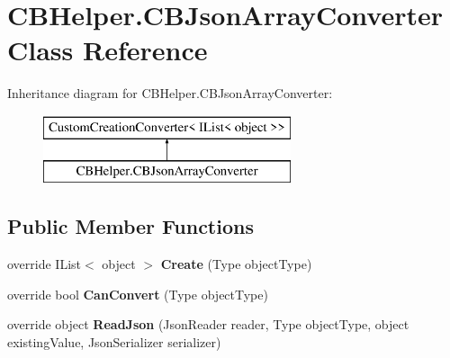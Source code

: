 \section{C\-B\-Helper.\-C\-B\-Json\-Array\-Converter Class Reference}
\label{class_c_b_helper_1_1_c_b_json_array_converter}
Inheritance diagram for C\-B\-Helper.\-C\-B\-Json\-Array\-Converter\-:\begin{figure}[H]
\begin{center}
\leavevmode
\includegraphics[height=2.000000cm]{class_c_b_helper_1_1_c_b_json_array_converter}
\end{center}
\end{figure}
\subsection*{Public Member Functions}
\begin{DoxyCompactItemize}
\item 
override I\-List$<$ object $>$ {\bfseries Create} (Type object\-Type)\label{class_c_b_helper_1_1_c_b_json_array_converter_a3d1211ac45f0526c728f25e09ebad0b7}

\item 
override bool {\bfseries Can\-Convert} (Type object\-Type)\label{class_c_b_helper_1_1_c_b_json_array_converter_a15dc069ce20ba205f0191047dcd52198}

\item 
override object {\bfseries Read\-Json} (Json\-Reader reader, Type object\-Type, object existing\-Value, Json\-Serializer serializer)\label{class_c_b_helper_1_1_c_b_json_array_converter_aef30008fcf952fff334edd7e38b8fc6d}

\end{DoxyCompactItemize}
